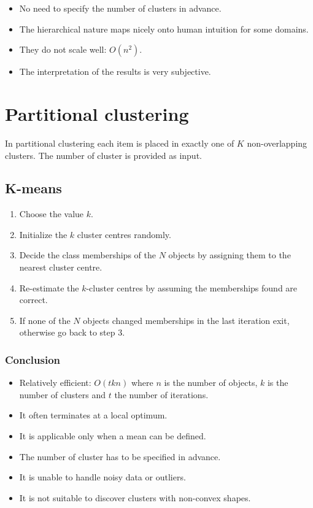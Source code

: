 	\begin{multicols}{2}
		\begin{itemize}
			\item No need to specify the number of clusters in advance.
			\item The hierarchical nature maps nicely onto human intuition for some domains.
			\item They do not scale well: $O(n^2)$.
			\item The interpretation of the results is very subjective.
		\end{itemize}
	\end{multicols}

\section{Partitional clustering}
In partitional clustering each item is placed in exactly one of $K$ non-overlapping clusters.
The number of cluster is provided as input.

	\subsection{K-means}

	\begin{enumerate}
		\item Choose the value $k$.
		\item Initialize the $k$ cluster centres randomly.
		\item Decide the class memberships of the $N$ objects by assigning them to the nearest cluster centre.
		\item Re-estimate the $k$-cluster centres by assuming the memberships found are correct.
		\item If none of the $N$ objects changed memberships in the last iteration exit, otherwise go back to step $3$.
	\end{enumerate}

		\subsubsection{Conclusion}

		\begin{multicols}{2}
			\begin{itemize}
				\item Relatively efficient: $O(tkn)$ where $n$ is the number of objects, $k$ is the number of clusters and $t$ the number of iterations.
				\item It often terminates at a local optimum.
				\item It is applicable only when a mean can be defined.
				\item The number of cluster has to be specified in advance.
				\item It is unable to handle noisy data or outliers.
				\item It is not suitable to discover clusters with non-convex shapes.
			\end{itemize}
		\end{multicols}

